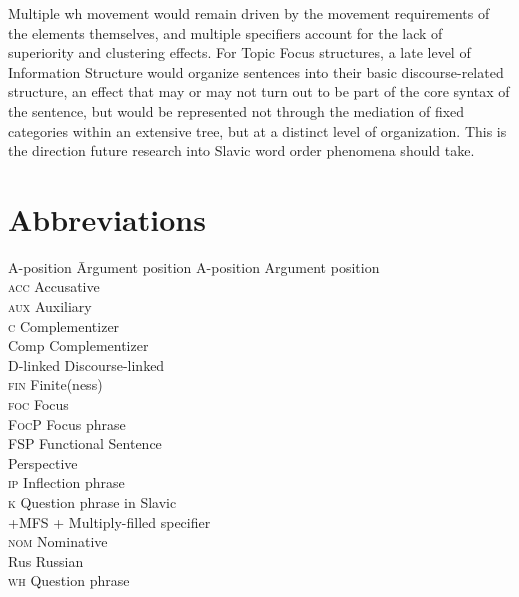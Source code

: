 \documentclass[output=paper]{langscibook}
\begin{document}
Multiple wh movement would remain driven by the movement requirements of the elements themselves, and multiple specifiers account for the lack of superiority and clustering effects.  For Topic Focus structures, a late level of Information Structure would organize sentences into their basic discourse-related structure, an effect that may or may not turn out to be part of the core syntax of the sentence, but would be represented not through the mediation of fixed categories within an extensive tree, but at a distinct level of organization. This is the direction future research into Slavic word order phenomena should take. 



\section*{Abbreviations}
\begin{multicols}{2}
\begin{tabbing}
A-position\hspace{.5ex}  \= 	Argument position\kill
A-position	 \>  Argument position	\\
\textsc{acc}	 \>  Accusative\\
\textsc{aux}	 \>  Auxiliary\\
\textsc{c}	 \>  Complementizer\\
Comp  \> 	Complementizer\\
D-linked  \> 	Discourse-linked\\
\textsc{fin}	 \>  Finite(ness)\\
\textsc{foc}	 \>  Focus\\
\textsc{FocP}  \> 	Focus phrase \\
FSP	 \>  Functional Sentence \\ \> Perspective\\
\textsc{ip}	 \>  Inflection phrase\\
\textsc{k}	 \>  Question phrase in Slavic\\
+MFS  \> 	+ Multiply-filled specifier\\
\textsc{nom}	 \>  Nominative\\
Rus	 \>  Russian\\
\textsc{wh}	 \>  Question phrase
\end{tabbing}
\end{multicols}
\end{document}
